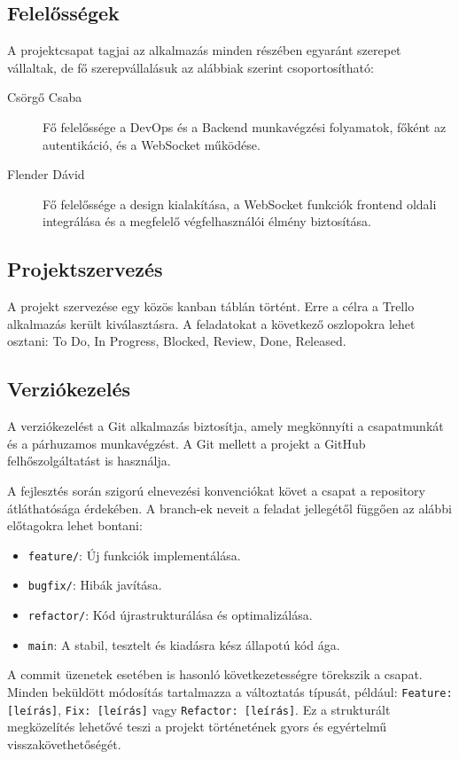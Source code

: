 \subsection{Felelősségek}
A projektcsapat tagjai az alkalmazás minden részében egyaránt szerepet vállaltak, de fő szerepvállalásuk az alábbiak szerint csoportosítható:

\begin{description}
    \item[Csörgő Csaba] Fő felelőssége a DevOps és a Backend munkavégzési folyamatok, főként az autentikáció, és a WebSocket működése.
    \item[Flender Dávid] Fő felelőssége a design kialakítása, a WebSocket funkciók frontend oldali integrálása és a megfelelő végfelhasználói élmény biztosítása.
\end{description}

\subsection{Projektszervezés}
A projekt szervezése egy közös kanban táblán történt. Erre a célra a Trello alkalmazás került kiválasztásra. A feladatokat a következő oszlopokra lehet osztani: To Do, In Progress, Blocked, Review, Done, Released.

\subsection{Verziókezelés}
A verziókezelést a Git alkalmazás biztosítja, amely megkönnyíti a csapatmunkát és a párhuzamos munkavégzést. A Git mellett a projekt a GitHub felhőszolgáltatást is használja.

A fejlesztés során szigorú elnevezési konvenciókat követ a csapat a repository átláthatósága érdekében. A branch-ek neveit a feladat jellegétől függően az alábbi előtagokra lehet bontani:
\begin{itemize}
    \item \texttt{feature/}: Új funkciók implementálása.
    \item \texttt{bugfix/}: Hibák javítása.
    \item \texttt{refactor/}: Kód újrastrukturálása és optimalizálása.
    \item \texttt{main}: A stabil, tesztelt és kiadásra kész állapotú kód ága.
\end{itemize}

A commit üzenetek esetében is hasonló következetességre törekszik a csapat. Minden beküldött módosítás tartalmazza a változtatás típusát, például: \texttt{Feature: [leírás]}, \texttt{Fix: [leírás]} vagy \texttt{Refactor: [leírás]}. Ez a strukturált megközelítés lehetővé teszi a projekt történetének gyors és egyértelmű visszakövethetőségét.